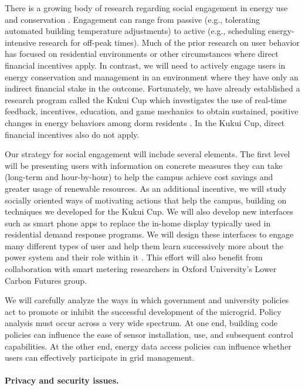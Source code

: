 There is a growing body of research regarding social engagement in energy
use and conservation
\cite{Hargreaves10,Stromback11,Darby06,Allcott11,Darby11,Hargreaves10,Faruqui10,
  Herter07}.  Engagement can range from passive (e.g., tolerating automated
building temperature adjustments) to active (e.g., scheduling
energy-intensive research for off-peak times).  Much of the prior research
on user behavior has focused on residential environments or other
circumstances where direct financial incentives apply.  In contrast, we
will need to actively engage users in energy conservation and management in
an environment where they have only an indirect financial stake in the
outcome.  Fortunately, we have already established a research program
called the Kukui Cup which investigates the use of real-time feedback,
incentives, education, and game mechanics to obtain sustained, positive
changes in energy behaviors among dorm residents
\cite{csdl2-11-03,csdl2-11-02}. In the Kukui Cup, direct financial
incentives also do not apply.

Our strategy for social engagement will include several elements. The first
level will be presenting users with information on concrete measures they
can take (long-term and hour-by-hour) to help the campus achieve cost
savings and greater usage of renewable resources. As an additional
incentive, we will study socially oriented ways of motivating actions that
help the campus, building on techniques we developed for the Kukui Cup. We
will also develop new interfaces such as smart phone apps to replace the
in-home display typically used in residential demand response programs. We
will design these interfaces to engage many different types of user and
help them learn successively more about the power system and their role
within it \cite{Stromback11}. This effort will also benefit from
collaboration with smart metering researchers in Oxford University's Lower
Carbon Futures group.

We will carefully analyze the ways in which government and university
policies act to promote or inhibit the successful development of the
microgrid.  Policy analysis must occur across a very wide spectrum. At one
end, building code policies can influence the ease of sensor installation,
use, and subsequent control capabilities.  At the other end, energy data access
policies can influence whether users can effectively participate in grid
management. 

\paragraph{Privacy and security issues.}

